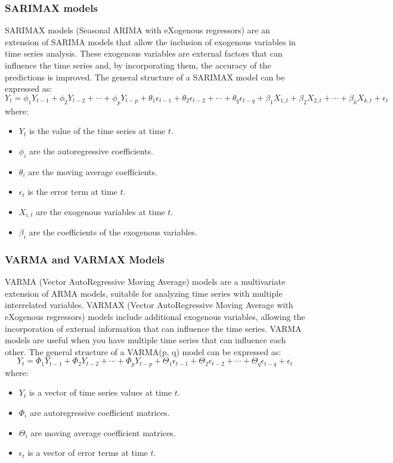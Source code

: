 \subsubsection{SARIMAX models}

SARIMAX models (Seasonal ARIMA with eXogenous regressors) are an extension of SARIMA models that allow the inclusion of exogenous variables in time series analysis. These exogenous variables are external factors that can influence the time series and, by incorporating them, the accuracy of the predictions is improved. The general structure of a SARIMAX model can be expressed as:
\[
Y_t = \phi_1 Y_{t-1} + \phi_2 Y_{t-2} + \cdots + \phi_p Y_{t-p} + \theta_1 \epsilon_{t-1} + \theta_2 \epsilon_{t-2} + \cdots + \theta_q \epsilon_{t-q} + \beta_1 X_{1,t} + \beta_2 X_{2,t} + \cdots + \beta_k X_{k,t} + \epsilon_t
\]
where:
\begin{itemize}
    \item \( Y_t \) is the value of the time series at time \( t \).
    \item \( \phi_i \) are the autoregressive coefficients.
    \item \( \theta_i \) are the moving average coefficients.
    \item \( \epsilon_t \) is the error term at time \( t \).
    \item \( X_{i,t} \) are the exogenous variables at time \( t \).
    \item \( \beta_i \) are the coefficients of the exogenous variables.
\end{itemize}

\subsubsection{VARMA and VARMAX Models}

VARMA (Vector AutoRegressive Moving Average) models are a multivariate extension of ARMA models, suitable for analyzing time series with multiple interrelated variables. VARMAX (Vector AutoRegressive Moving Average with eXogenous regressors) models include additional exogenous variables, allowing the incorporation of external information that can influence the time series. VARMA models are useful when you have multiple time series that can influence each other. The general structure of a VARMA(p, q) model can be expressed as:
\[
Y_t = \Phi_1 Y_{t-1} + \Phi_2 Y_{t-2} + \cdots + \Phi_p Y_{t-p} + \Theta_1 \epsilon_{t-1} + \Theta_2 \epsilon_{t-2} + \cdots + \Theta_q \epsilon_{t-q} + \epsilon_t
\]
where:
\begin{itemize}
    \item \( Y_t \) is a vector of time series values at time \( t \).
    \item \( \Phi_i \) are autoregressive coefficient matrices.
    \item \( \Theta_i \) are moving average coefficient matrices.
    \item \( \epsilon_t \) is a vector of error terms at time \( t \).
\end{itemize}

